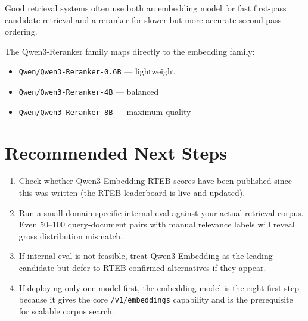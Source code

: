 \begin{notebox}
Good retrieval systems often use both an embedding model for fast first-pass candidate
retrieval and a reranker for slower but more accurate second-pass ordering.

The Qwen3-Reranker family maps directly to the embedding family:
\begin{itemize}
    \item \texttt{Qwen/Qwen3-Reranker-0.6B} --- lightweight
    \item \texttt{Qwen/Qwen3-Reranker-4B} --- balanced
    \item \texttt{Qwen/Qwen3-Reranker-8B} --- maximum quality
\end{itemize}
\end{notebox}

\section{Recommended Next Steps}

\begin{enumerate}
    \item Check whether Qwen3-Embedding RTEB scores have been published since this was
          written (the RTEB leaderboard is live and updated).
    \item Run a small domain-specific internal eval against your actual retrieval corpus.
          Even 50--100 query-document pairs with manual relevance labels will reveal gross
          distribution mismatch.
    \item If internal eval is not feasible, treat Qwen3-Embedding as the leading candidate
          but defer to RTEB-confirmed alternatives if they appear.
    \item If deploying only one model first, the embedding model is the right first step
          because it gives the core \texttt{/v1/embeddings} capability and is the prerequisite
          for scalable corpus search.
\end{enumerate}
